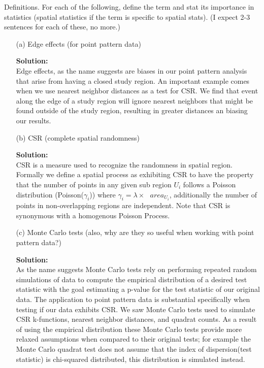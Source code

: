 \documentclass[12pt]{article}
\makeatletter
\theoremstyle{homework}
\newenvironment{exercise}[1]
{\def\@currentlabel{#1}\exercisecore}
{\endexercisecore}
\newcommand{\localhead}[1]{\par\smallskip\noindent\textbf{#1}\nobreak\\}%
\newcommand\solution{\localhead{Solution:}}
\makeatother
\begin{document}
\begin{exercise}{1} Definitions. For each of the following, define the term and stat its importance in statistics (spatial 
  statistics if the term is specific to spatial stats). (I expect 2-3 sentences for each of these, no more.)\\
  \begin{enumerate}
    \item[(a)] Edge effects (for point pattern data)\\
    \solution Edge effects, as the name suggests are biases in our point pattern analysis that arise from having a closed study region. An important example comes when we 
    use nearest neighbor distances as a test for CSR. We find that event along the edge of a study region will ignore nearest neighbors that might be found outside of the study region, resulting in greater distances an biasing our results. 

    \vspace{.15in} 
    \item[(b)] CSR (complete spatial randomness)\\
    \solution CSR is a measure used to recognize the randomness in spatial region. Formally we define a spatial process as exhibiting CSR to have the property that 
    the number of points in any given sub region $U_i$ follows a Poisson distribution (Poisson($\gamma_i$)) where $\gamma_i = \lambda \times \text{ $area_{U_i}$} $, 
    additionally the number of points in non-overlapping regions are independent. Note that CSR is synonymous with a homogenous Poisson Process. 
    \vspace{.15in} 
    \item[(c)] Monte Carlo tests (also, why are they so useful when working with point pattern data?)\\
    \solution As the name suggests Monte Carlo tests rely on performing repeated random simulations of data to compute the empirical distribution of a desired test statistic with the goal estimating a p-value for 
    the test statistic of our original data. The application to point pattern data is substantial specifically when testing if
    our data exhibits CSR. We saw Monte Carlo tests used to simulate CSR k-functions, nearest neighbor distances, and quadrat counts. As a result of using the empirical distribution these Monte Carlo tests
    provide more relaxed assumptions when compared to their original tests; for example the Monte Carlo quadrat test does not assume that the index of dispersion(test statistic) is chi-squared distributed, 
    this distribution is simulated instead. 
  \end{enumerate} 
\end{exercise}
\newpage
\end{document}
